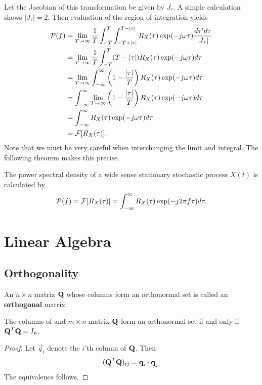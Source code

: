\documentclass{memoir}
\begin{document}
Let the Jacobian of this transformation be given by $J_ \tau$. A simple calculation shows $|J_ \tau|=2$. Then evaluation of the region of integration yields
\begin{align*}
    \mathcal{P}(f) &=\lim_{T \to \infty}\frac{1}{T}\int_{-T}^{T}\int_{-T+|\tau|}^{T-|\tau|}R_X(\tau)\exp(-j \omega \tau)\frac{d \tau' d \tau}{|J_ \tau|} \\
     &=\lim_{T \to \infty}\frac{1}{T}\int_{-T}^{T}(T - | \tau|)R_X(\tau)\exp(-j \omega \tau)d \tau \\
     &=\lim_{T \to \infty}\int_{-\infty}^{\infty}\left(1 - \frac{| \tau|}{T}\right)R_X(\tau)\exp(-j \omega \tau)d \tau \\
     &=\int_{-\infty}^{\infty}\lim_{T \to \infty}\left(1 - \frac{| \tau|}{T}\right)R_X(\tau)\exp(-j \omega \tau)d \tau \\
    &=\int_{-\infty}^{\infty}R_X(\tau)\exp(-j \omega \tau)d \tau \\
    &= \mathcal{F}[R_X(\tau)].
\end{align*}
Note that we must be very careful when interchanging the limit and integral. The following theorem makes this precise.

\begin{theorem}
    The power spectral density of a wide sense stationary stochastic process $X(t)$ is calculated by
    \begin{align*}
        \mathcal{P}(f) = \mathcal{F}[R_X(\tau)] = \int_{-\infty}^{\infty} R_X(\tau) \exp(-j2\pi f \tau) d \tau.
    \end{align*}
\end{theorem}

\section{Linear Algebra}
\subsection{Orthogonality}
\begin{definition}
    An $n \times n$ matrix $\boldsymbol{\mathbf{Q}}$ whose columns form an orthonormal set is called an \textbf{orthogonal} matrix.
\end{definition}

\begin{theorem}
    The columns of and $m \times n$ matrix $\boldsymbol{\mathbf{Q}}$ form an orthonormal set if and only if $\boldsymbol{\mathbf{Q}}^T \boldsymbol{\mathbf{Q}}=I_n$.
\end{theorem}
\begin{proof}
    Let $\vec{q}_i$ denote the $i$'th column of $\boldsymbol{\mathbf{Q}}$. Then
    \begin{align*}
        (\boldsymbol{\mathbf{Q}}^T \boldsymbol{\mathbf{Q}})_{ij} = \boldsymbol{\mathbf{q}}_i \cdot \boldsymbol{\mathbf{q}}_j.
    \end{align*}
    The equivalence follows.
\end{proof}
\end{document}
